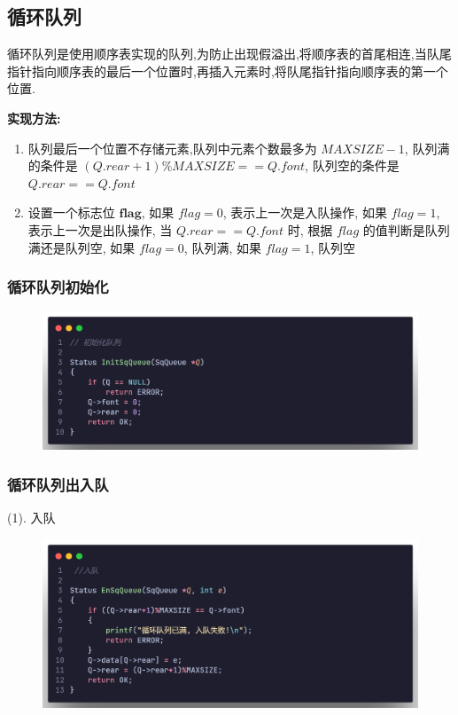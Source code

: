 \subsection{循环队列}
\begin{definition}[循环队列]
    循环队列是使用顺序表实现的队列,为防止出现假溢出,将顺序表的首尾相连,当队尾指针指向顺序表的最后一个位置时,再插入元素时,将队尾指针指向顺序表的第一个位置.

    \textbf{实现方法:}
    \begin{enumerate}
        \item 队列最后一个位置不存储元素,队列中元素个数最多为 $MAXSIZE-1$, 队列满的条件是 $(Q.rear+1)\% MAXSIZE == Q.font$, 队列空的条件是 $Q.rear == Q.font$
        \item 设置一个标志位 $\mathbf{flag}$, 如果 $flag = 0$, 表示上一次是入队操作, 如果 $flag = 1$, 表示上一次是出队操作, 当 $Q.rear == Q.font$ 时, 根据 $flag$ 的值判断是队列满还是队列空, 如果 $flag = 0$, 队列满, 如果 $flag = 1$, 队列空
    \end{enumerate}
\end{definition}
\subsubsection{循环队列初始化}

\begin{figure}[H]
    \centering
    \includegraphics[scale=0.2]{"figure/Note/Stack/QInit.png"}
\end{figure}

\subsubsection{循环队列出入队}

(1). 入队

\begin{figure}[H]
    \centering
    \includegraphics[scale=0.2]{"figure/Note/Stack/QEq.png"}
\end{figure}

